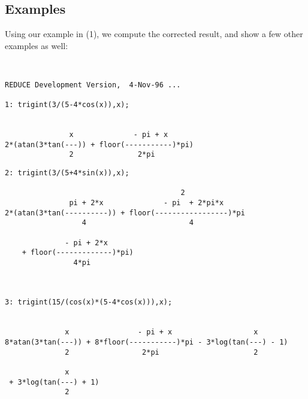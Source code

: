 \subsection{Examples}
Using our example in (1), we compute the corrected result, and show a few other examples as well:
\begin{verbatim}


REDUCE Development Version,  4-Nov-96 ...

1: trigint(3/(5-4*cos(x)),x);


               x              - pi + x
2*(atan(3*tan(---)) + floor(-----------)*pi)
               2               2*pi

\end{verbatim}
\pagebreak
\begin{verbatim}
2: trigint(3/(5+4*sin(x)),x);

                                         2
               pi + 2*x              - pi  + 2*pi*x
2*(atan(3*tan(----------)) + floor(-----------------)*pi
                  4                        4

              - pi + 2*x
    + floor(-------------)*pi)
                4*pi



3: trigint(15/(cos(x)*(5-4*cos(x))),x);


              x                - pi + x                   x
8*atan(3*tan(---)) + 8*floor(-----------)*pi - 3*log(tan(---) - 1)
              2                 2*pi                      2

              x
 + 3*log(tan(---) + 1)
              2


\end{verbatim}
